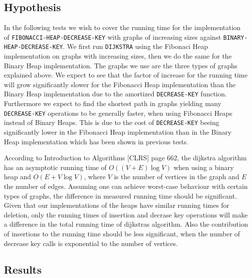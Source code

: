 \documentclass[a4paper,10pt]{article}
\begin{document}
\subsection*{Hypothesis}
In the following tests we wish to cover the running time for the implementation of \texttt{FIBONACCI\--HEAP\--DECREASE\--KEY} with graphs of increasing sizes against \texttt{BINARY\--HEAP\--DECREASE\--KEY}. We first run \texttt{DIJKSTRA} using the Fibonaci Heap implementation on graphs with increasing sizes, then we do the same for the Binary Heap implementation. The graphs we use are the three types of graphs explained above. We expect to see that the factor of increase for the running time will grow significantly slower for the Fibonacci Heap implementation than the Binary Heap implementation due to the amortized  \texttt{DECREASE-KEY} function. Furthermore we expect to find the shortest path in graphs yielding many \texttt{DECREASE-KEY} operations to be generally faster, when using Fibonacci Heaps instead of Binary Heaps. This is due to the cost of \texttt{DECREASE-KEY} beeing significantly lower in the Fibonacci Heap implementation than in the Binary Heap implementation which has been shown in previous tests.

According to Introduction to Algorithms [CLRS] page 662, the dijkstra algorithm has an asymptotic running time of $O((V+E)\log V)$ when using a binary heap and $O(E + V\log V)$, where $V$ is the number of vertices in the graph and $E$ the number of edges. Assuming one can achieve worst-case behaviour with certain types of graphs, the difference in measured running time should be significant. Given that our implementations of the heaps have similar running times for deletion, only the running times of insertion and decrase key operations will make a difference in the total running time of dijkstras algorithm. Also the contribution of insertions to the running time should be less significant, when the number of decrease key calls is exponential to the number of vertices. 
\subsection*{Results}
\end{document}
